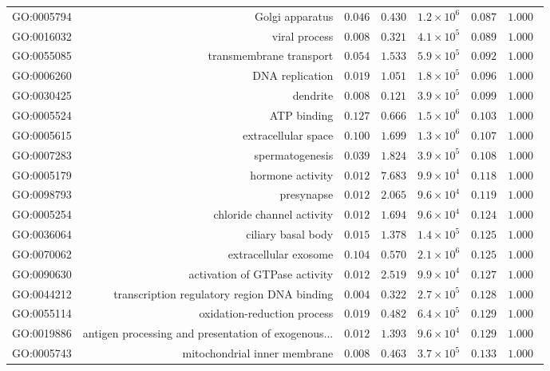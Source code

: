 \documentclass{article}
\begin{document}
\begin{longtable}{|l|r|r|r|r|r|r|}
GO:0005794 & Golgi apparatus & $ 0.046$ & $ 0.430$ & $1.2\times 10^{6}$ & $ 0.087$ & $ 1.000~~$ \\
GO:0016032 & viral process & $ 0.008$ & $ 0.321$ & $4.1\times 10^{5}$ & $ 0.089$ & $ 1.000~~$ \\
GO:0055085 & transmembrane transport & $ 0.054$ & $ 1.533$ & $5.9\times 10^{5}$ & $ 0.092$ & $ 1.000~~$ \\
GO:0006260 & DNA replication & $ 0.019$ & $ 1.051$ & $1.8\times 10^{5}$ & $ 0.096$ & $ 1.000~~$ \\
GO:0030425 & dendrite & $ 0.008$ & $ 0.121$ & $3.9\times 10^{5}$ & $ 0.099$ & $ 1.000~~$ \\
GO:0005524 & ATP binding & $ 0.127$ & $ 0.666$ & $1.5\times 10^{6}$ & $ 0.103$ & $ 1.000~~$ \\
GO:0005615 & extracellular space & $ 0.100$ & $ 1.699$ & $1.3\times 10^{6}$ & $ 0.107$ & $ 1.000~~$ \\
GO:0007283 & spermatogenesis & $ 0.039$ & $ 1.824$ & $3.9\times 10^{5}$ & $ 0.108$ & $ 1.000~~$ \\
GO:0005179 & hormone activity & $ 0.012$ & $ 7.683$ & $9.9\times 10^{4}$ & $ 0.118$ & $ 1.000~~$ \\
GO:0098793 & presynapse & $ 0.012$ & $ 2.065$ & $9.6\times 10^{4}$ & $ 0.119$ & $ 1.000~~$ \\
GO:0005254 & chloride channel activity & $ 0.012$ & $ 1.694$ & $9.6\times 10^{4}$ & $ 0.124$ & $ 1.000~~$ \\
GO:0036064 & ciliary basal body & $ 0.015$ & $ 1.378$ & $1.4\times 10^{5}$ & $ 0.125$ & $ 1.000~~$ \\
GO:0070062 & extracellular exosome & $ 0.104$ & $ 0.570$ & $2.1\times 10^{6}$ & $ 0.125$ & $ 1.000~~$ \\
GO:0090630 & activation of GTPase activity & $ 0.012$ & $ 2.519$ & $9.9\times 10^{4}$ & $ 0.127$ & $ 1.000~~$ \\
GO:0044212 & transcription regulatory region DNA binding & $ 0.004$ & $ 0.322$ & $2.7\times 10^{5}$ & $ 0.128$ & $ 1.000~~$ \\
GO:0055114 & oxidation-reduction process & $ 0.019$ & $ 0.482$ & $6.4\times 10^{5}$ & $ 0.129$ & $ 1.000~~$ \\
GO:0019886 & antigen processing and presentation of exogenous... & $ 0.012$ & $ 1.393$ & $9.6\times 10^{4}$ & $ 0.129$ & $ 1.000~~$ \\
GO:0005743 & mitochondrial inner membrane & $ 0.008$ & $ 0.463$ & $3.7\times 10^{5}$ & $ 0.133$ & $ 1.000~~$ \\

\end{longtable}
\end{document}
